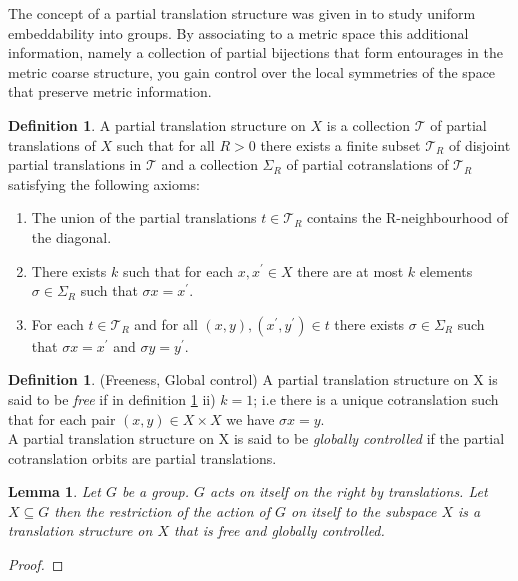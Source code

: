 \documentclass[11pt]{amsart}
\theoremstyle{plain}
\newtheorem{lemma}[theorem]{Lemma}%
\theoremstyle{definition}%
\newtheorem{definition}[theorem]{Definition}%
\theoremstyle{remark}%
\begin{document}
The concept of a partial translation structure was given in \cite{MR2363428} to study uniform embeddability into groups. By associating to a metric space this additional information, namely a collection of partial bijections that form entourages in the metric coarse structure, you gain control over the local symmetries of the space that preserve metric information. 


\begin{definition}\label{PT2}
A partial translation structure on $X$ is a collection $\mathcal{T}$ of partial translations of $X$ such that for all $R>0$ there exists a finite subset $\mathcal{T}_{R}$ of disjoint partial translations in $\mathcal{T}$ and a collection $\Sigma_{R}$ of partial cotranslations of $\mathcal{T}_{R}$ satisfying the following axioms:
\begin{enumerate}
\item The union of the partial translations  $t \in \mathcal{T}_{R}$ contains the R-neighbourhood of the diagonal.
\item There exists $k$ such that for each $x,x^{'} \in X$ there are at most $k$ elements $\sigma \in \Sigma_{R}$ such that $\sigma x=x^{'}$.
\item For each $t \in \mathcal{T}_{R}$ and for all $(x,y),(x^{'},y^{'}) \in t$ there exists $\sigma \in \Sigma_{R}$ such that $\sigma x=x^{'}$ and $\sigma y=y^{'}$.
\end{enumerate}
\end{definition}

\begin{definition}(Freeness, Global control)
A partial translation structure on X is said to be \textit{free} if in definition \ref{PT2} ii) $k=1$; i.e there is a unique cotranslation such that for each pair $(x,y)\in X \times X$ we have $\sigma x = y$.\\
A partial translation structure on X is said to be \textit{globally controlled} if the partial cotranslation orbits are partial translations. 
\end{definition}

\begin{lemma}\label{lem:L10}
Let $G$ be a group. $G$ acts on itself on the right by translations. Let $X \subseteq G$ then the restriction of the action of $G$ on itself to the subspace $X$ is a translation structure on $X$ that is free and globally controlled.
\end{lemma}
\begin{proof}

\end{proof}
\end{document}
